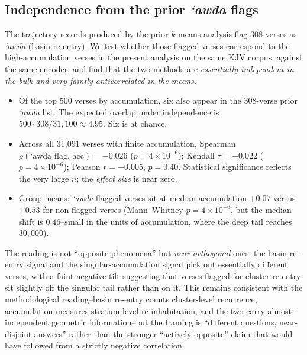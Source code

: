 \documentclass[11pt,a4paper]{article}
\theoremstyle{definition}
\begin{document}
\subsection{Independence from the prior \emph{`awda} flags}

The trajectory records produced by the prior $k$-means analysis
\cite{poernomo-kjv2026} flag 308 verses as \emph{`awda} (basin
re-entry). We test whether those flagged verses correspond to the
high-accumulation verses in the present analysis on the same KJV
corpus, against the same encoder, and find that the two methods are
\emph{essentially independent in the bulk and very faintly
anticorrelated in the means.}

\begin{itemize}
\item Of the top 500 verses by accumulation, six also appear in the
  308-verse prior \emph{`awda} list. The expected overlap under
  independence is $500 \cdot 308 / 31{,}100 \approx 4.95$. Six is at
  chance.
\item Across all 31{,}091 verses with finite accumulation,
  Spearman $\rho(\text{`awda flag},\,\mathrm{acc}) = -0.026$
  ($p = 4 \times 10^{-6}$); Kendall
  $\tau = -0.022$ ($p = 4 \times 10^{-6}$); Pearson
  $r = -0.005$, $p = 0.40$. Statistical
  significance reflects the very large $n$; the \emph{effect size} is
  near zero.
\item Group means: \emph{`awda}-flagged verses sit at median accumulation
  $+0.07$ versus $+0.53$ for non-flagged verses (Mann--Whitney
  $p = 4 \times 10^{-6}$, but the median shift is
  $0.46$--small in the units of accumulation, where the deep tail
  reaches $30{,}000$).
\end{itemize}

\noindent The reading is not ``opposite phenomena'' but
\emph{near-orthogonal} ones: the basin-re-entry signal and the
singular-accumulation signal pick out essentially different verses,
with a faint negative tilt suggesting that verses flagged for cluster
re-entry sit slightly off the singular tail rather than on it. This
remains consistent with the methodological reading--basin re-entry
counts cluster-level recurrence, accumulation measures stratum-level
re-inhabitation, and the two carry almost-independent geometric
information--but the framing is ``different questions, near-disjoint
answers'' rather than the stronger ``actively opposite'' claim that
would have followed from a strictly negative correlation.

\end{document}
